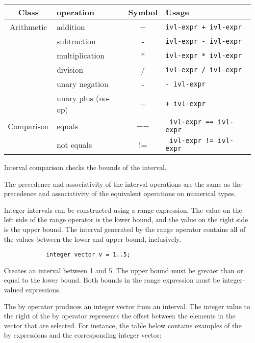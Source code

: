\documentclass[../../gazprea.tex]{subfiles}
\begin{document}
		\begin{center}
			\begin{tabular}{|c|l|c|l|}
				\hline
				\textbf{Class} & \textbf{operation} & \textbf{Symbol} & \textbf{Usage} \\
				\hline
				Arithmetic & addition           & + & \texttt{ivl-expr + ivl-expr}  \\
				           & subtraction        & - &  \texttt{ivl-expr - ivl-expr}	\\
				           & multiplication     & * & \texttt{ivl-expr * ivl-expr}	\\
				           & division           & / & \texttt{ivl-expr / ivl-expr}	\\
				           & unary negation     & - & \texttt{- ivl-expr}	          \\
				           & unary plus (no-op) & + & \texttt{+ ivl-expr}           \\
				\hline
				Comparison & equals     & == & \texttt{ ivl-expr == ivl-expr} \\
				           & not equals & != & \texttt{ ivl-expr != ivl-expr} \\
				\hline
			\end{tabular}
		\end{center}

		Interval comparison checks the bounds of the interval.

		The precedence and associativity of the interval operations are the same as the precedence and associativity of
		the equivalent operations on numerical types.

		Integer intervals can be constructed using a range expression. The value on the left side of the range operator
		is the lower bound, and the value on the right side is the upper bound. The interval generated by the range
		operator contains all of the values between the lower and upper bound, inclusively.

		\begin{lstlisting}
			integer vector v = 1..5;
		\end{lstlisting}

		Creates an interval between 1 and 5. The upper bound must be greater than or equal to the lower bound. Both
		bounds in the range expression must be integer-valued expressions.

		The by operator produces an integer vector from an interval. The integer value to the right of the by operator
		represents the offset between the elements in the vector that are selected. For instance, the table below
		contains examples of the by expressions and the corresponding integer vector:
\end{document}
